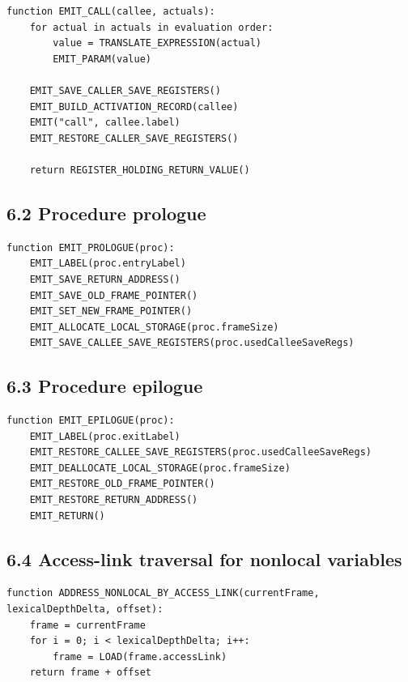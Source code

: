 \documentclass[10pt,letterpaper]{article}
\begin{document}
\begin{verbatim}
function EMIT_CALL(callee, actuals):
    for actual in actuals in evaluation order:
        value = TRANSLATE_EXPRESSION(actual)
        EMIT_PARAM(value)

    EMIT_SAVE_CALLER_SAVE_REGISTERS()
    EMIT_BUILD_ACTIVATION_RECORD(callee)
    EMIT("call", callee.label)
    EMIT_RESTORE_CALLER_SAVE_REGISTERS()

    return REGISTER_HOLDING_RETURN_VALUE()
\end{verbatim}

\subsection*{6.2 Procedure prologue}

\begin{verbatim}
function EMIT_PROLOGUE(proc):
    EMIT_LABEL(proc.entryLabel)
    EMIT_SAVE_RETURN_ADDRESS()
    EMIT_SAVE_OLD_FRAME_POINTER()
    EMIT_SET_NEW_FRAME_POINTER()
    EMIT_ALLOCATE_LOCAL_STORAGE(proc.frameSize)
    EMIT_SAVE_CALLEE_SAVE_REGISTERS(proc.usedCalleeSaveRegs)
\end{verbatim}

\subsection*{6.3 Procedure epilogue}

\begin{verbatim}
function EMIT_EPILOGUE(proc):
    EMIT_LABEL(proc.exitLabel)
    EMIT_RESTORE_CALLEE_SAVE_REGISTERS(proc.usedCalleeSaveRegs)
    EMIT_DEALLOCATE_LOCAL_STORAGE(proc.frameSize)
    EMIT_RESTORE_OLD_FRAME_POINTER()
    EMIT_RESTORE_RETURN_ADDRESS()
    EMIT_RETURN()
\end{verbatim}

\subsection*{6.4 Access-link traversal for nonlocal variables}

\begin{verbatim}
function ADDRESS_NONLOCAL_BY_ACCESS_LINK(currentFrame, lexicalDepthDelta, offset):
    frame = currentFrame
    for i = 0; i < lexicalDepthDelta; i++:
        frame = LOAD(frame.accessLink)
    return frame + offset
\end{verbatim}
\end{document}
